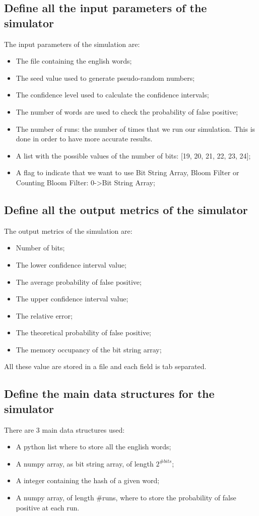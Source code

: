 \documentclass{report}
\begin{document}
{				\subsection{Define all the input parameters of the simulator}
					The input parameters of the simulation are:
					\begin{itemize}
						\item The file containing the english words;
						\item The seed value used to generate pseudo-random numbers;
						\item The confidence level used to calculate the confidence intervals;
						\item The number of words are used to check the probability of false positive;
						\item The number of runs: the number of times that we run our simulation. This is done in order to have more accurate results.
						\item A list with the possible values of the number of bits: [19, 20, 21, 22, 23, 24];
						\item A flag to indicate that we want to use Bit String Array, Bloom Filter or Counting Bloom Filter: 0->Bit String Array;
					\end{itemize}
					 
				\subsection{Define all the output metrics of the simulator}
				The output metrics of the simulation are:
				\begin{itemize}
					\item Number of bits;
					\item The lower confidence interval value;
					\item The average probability of false positive;
					\item The upper confidence interval value;
					\item The relative error;
					\item The theoretical probability of false positive;
					\item The memory occupancy of the bit string array;
				\end{itemize}
				All these value are stored in a file and each field is tab separated.
			
			\subsection{Define the main data structures for the simulator}
						There are 3 main data structures used: 
							\begin{itemize}
								\item A python list where to store all the english words;
								\item A numpy array, as bit string array, of length $2^{\#bits}$;
								\item A integer containing the hash of a given word;
								\item A numpy array, of length \#runs, where to store the probability of false positive at each run.
							\end{itemize}
					
}
\end{document}
